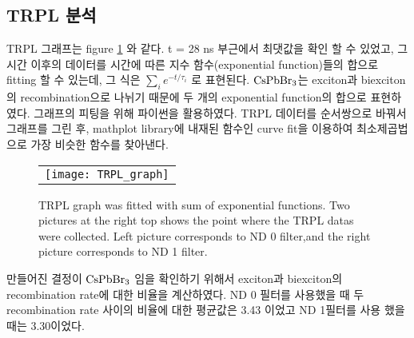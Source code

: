 \subsection{TRPL 분석}
TRPL 그래프는 figure \ref{fig:FIR105} 와 같다. t = 28 ns 부근에서 최댓값을 확인 할 수 있었고, 그 시간 이후의 데이터를 시간에 따른 지수 함수(exponential function)들의 합으로 fitting 할 수 있는데, 그 식은 $\sum_{i}^{} {e}^{-t/{\tau}_{i}}$ 로 표현된다. $\rm{CsPbBr_3}$는 exciton과 biexciton의 recombination으로 나뉘기 때문에 두 개의 exponential function의 합으로 표현하였다. 그래프의 피팅을 위해 파이썬을 활용하였다. TRPL 데이터를 순서쌍으로 바꿔서 그래프를 그린 후, mathplot library에 내재된 함수인 curve fit을 이용하여 최소제곱법으로 가장 비슷한 함수를 찾아낸다.
\begin{figure}[h]
	\begin{center}
		\begin{tabular}{c}
			\texttt{[image: TRPL\_graph]}
		\end{tabular}
		\caption{TRPL graph was fitted with sum of exponential functions. Two pictures at the right top shows the point where the TRPL datas were collected. Left picture corresponds to ND 0 filter,and the right picture corresponds to ND 1 filter. }	
		\label{fig:FIR105}
	\end{center}
\end{figure}
 만들어진 결정이 $\rm{CsPbBr_3}$ 임을 확인하기 위해서 exciton과 biexciton의 recombination rate에 대한 비율을 계산하였다. ND 0 필터를 사용했을 때 두 recombination rate 사이의 비율에 대한 평균값은 3.43 이었고 ND 1필터를 사용 했을 때는 3.30이었다.
